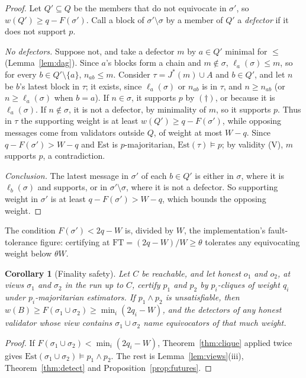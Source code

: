 \documentclass[11pt]{article}
\newtheorem{corollary}[theorem]{Corollary}
\theoremstyle{definition}
\theoremstyle{remark}
\newcommand{\Jst}{J^{*}}
\newcommand{\Est}{\mathrm{Est}}
\begin{document}
\begin{proof}
Let $Q'\subseteq Q$ be the members that do not equivocate in $\sigma'$, so
$w(Q')\ge q-F(\sigma')$. Call a block of $\sigma'\setminus\sigma$ by a member of
$Q'$ a \emph{defector} if it does not support $p$.

\emph{No defectors.} Suppose not, and take a defector $m$ by $a\in Q'$ minimal
for $\le$ (Lemma~\ref{lem:dag}). Since $a$'s blocks form a chain and
$m\notin\sigma$, $\ell_a(\sigma)\le m$, so for every $b\in Q'\setminus\{a\}$,
$n_{ab}\le m$. Consider $\tau=\Jst(m)\cup A$ and $b\in Q'$, and let $n$ be $b$'s
latest block in $\tau$; it exists, since $\ell_a(\sigma)$ or $n_{ab}$ is in
$\tau$, and $n\ge n_{ab}$ (or $n\ge\ell_a(\sigma)$ when $b=a$). If
$n\in\sigma$, it supports $p$ by $(\dagger)$, or because it is $\ell_a(\sigma)$.
If $n\notin\sigma$, it is not a defector, by minimality of $m$, so it supports
$p$. Thus in $\tau$ the supporting weight is at least $w(Q')\ge q-F(\sigma')$,
while opposing messages come from validators outside $Q$, of weight at most
$W-q$. Since $q-F(\sigma')>W-q$ and $\Est$ is $p$-majoritarian,
$\Est(\tau)\models p$; by validity (V), $m$ supports $p$, a contradiction.

\emph{Conclusion.} The latest message in $\sigma'$ of each $b\in Q'$ is either
in $\sigma$, where it is $\ell_b(\sigma)$ and supports, or in
$\sigma'\setminus\sigma$, where it is not a defector. So supporting weight in
$\sigma'$ is at least $q-F(\sigma')>W-q$, which bounds the opposing weight.
\end{proof}

The condition $F(\sigma')<2q-W$ is, divided by $W$, the implementation's
fault-tolerance figure: certifying at $\mathrm{FT}=(2q-W)/W\ge\theta$
tolerates any equivocating weight below $\theta W$.

\begin{corollary}[Finality safety]\label{cor:finality}
Let $C$ be reachable, and let honest $o_1$ and $o_2$, at views $\sigma_1$ and
$\sigma_2$ in the run up to $C$, certify $p_1$ and $p_2$ by $p_i$-cliques of
weight $q_i$ under $p_i$-majoritarian estimators. If $p_1\wedge p_2$ is
unsatisfiable, then $w(B)\ge F(\sigma_1\cup\sigma_2)\ge\min_i(2q_i-W)$, and
the detectors of any honest validator whose view contains
$\sigma_1\cup\sigma_2$ name equivocators of that much weight.
\end{corollary}

\begin{proof}
If $F(\sigma_1\cup\sigma_2)<\min_i(2q_i-W)$, Theorem~\ref{thm:clique} applied
twice gives $\Est(\sigma_1\cup\sigma_2)\models p_1\wedge p_2$. The rest is
Lemma~\ref{lem:views}(iii), Theorem~\ref{thm:detect} and
Proposition~\ref{prop:futures}.
\end{proof}
\end{document}
